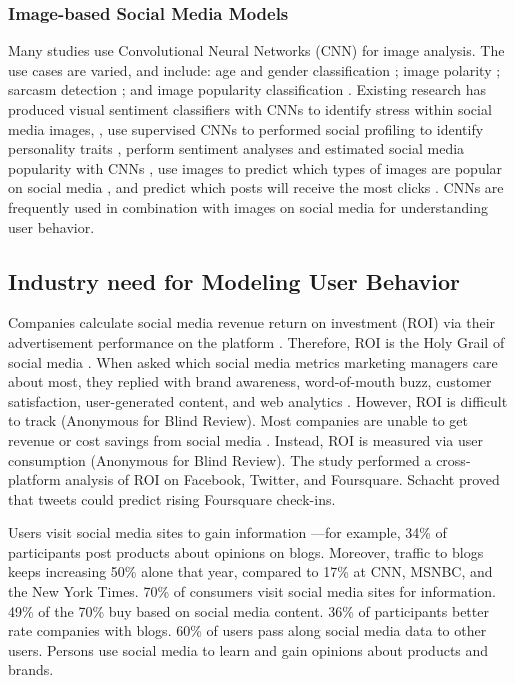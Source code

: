 \documentclass[mksc,blindrev]{informs3} %
\begin{document}
\subsubsection{Image-based Social Media Models}
Many studies use Convolutional Neural Networks (CNN) for image analysis. The use cases are varied, and include: age and gender classification \cite{Hassner2015}; image polarity \cite{Poria2016}; sarcasm detection \cite{Poria2016}; and image popularity classification \cite{Khosla2014}. Existing research has produced visual sentiment classifiers with CNNs \cite{Segalin2017,Xu2014} to identify stress within social media images, \cite{Lin2014}, use supervised CNNs to performed social profiling to identify personality traits \cite{Segalin2017}, perform sentiment analyses and estimated social media popularity with CNNs \cite{Gelli2015}, use images to predict which types of images are popular on social media \cite{Gelli2015}, and predict which posts will receive the most clicks \cite{Khosla2014}. CNNs are frequently used in combination with images on social media for understanding user behavior.

\subsection{Industry need for Modeling User Behavior}

Companies calculate social media revenue return on investment (ROI) via their advertisement performance on the platform \cite{Fisher2009}. Therefore, ROI is the Holy Grail of social media \cite{Fisher2009}. When asked which social media metrics marketing managers care about most, they replied with brand awareness, word-of-mouth buzz, customer satisfaction, user-generated content, and web analytics \cite{Tiago2014}. However, ROI is difficult to track (Anonymous for Blind Review). Most companies are unable to get revenue or cost savings from social media \cite{Romero2011}. Instead, ROI is measured via user consumption (Anonymous for Blind Review). The study performed a cross-platform analysis of ROI on Facebook, Twitter, and Foursquare. Schacht proved that tweets could predict rising Foursquare check-ins.

Users visit social media sites to gain information \cite{Fisher2009}—for example, 34\% of participants post products about opinions on blogs. Moreover, traffic to blogs keeps increasing 50\% alone that year, compared to 17\% at CNN, MSNBC, and the New York Times. 70\% of consumers visit social media sites for information. 49\% of the 70\% buy based on social media content. 36\% of participants better rate companies with blogs. 60\% of users pass along social media data to other users. Persons use social media to learn and gain opinions about products and brands.
\end{document}
